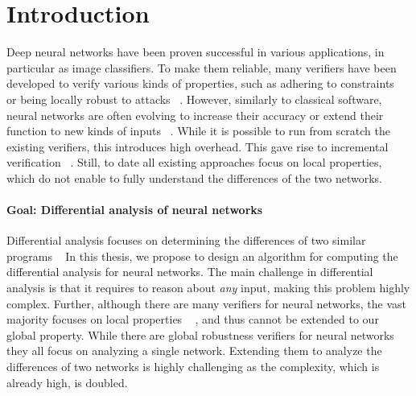 
\section{Introduction}
Deep neural networks have been proven successful in various applications, in particular as image classifiers.
To make them reliable, many verifiers have been developed to verify various kinds of properties, such as adhering to constraints~\cite{Reluplex,COMPLETE,PLANET} or being locally robust to attacks ~\cite{Reluplex,ABSTRACTINTER,NEURIPS2021_fac7fead,COMPLETE}. However, similarly to classical software, neural networks are often evolving to increase their accuracy or extend their function to new kinds of inputs ~\cite{SURVEY_ROBUSTNESS,INTPROP}. While it is possible to run from scratch the existing verifiers, this introduces high overhead. This gave rise to incremental verification ~\cite{IVAN,INC_SEMIDEFINIT,INC_SMOOTH}. Still, to date all existing approaches focus on local properties, which do not enable to fully understand the differences of the two networks.

\paragraph{Goal: Differential analysis of neural networks}
Differential analysis focuses on determining the differences of two similar programs ~\cite{RELUDIFF,NEURODIFF,DIFFRNN,QEBVERIF,CFXROBUSTNESS}
In this thesis, we propose to design an algorithm for computing the differential analysis for neural networks.
The main challenge in differential analysis is that it requires to reason about \emph{any} input, 
making this problem highly complex. Further, although there are many verifiers for neural networks, the vast majority focuses on local properties ~\cite{Reluplex,ABSTRACTINTER,NEURIPS2021_fac7fead,COMPLETE,CROWN}
, and thus cannot be extended to our global property. While there are global robustness verifiers for neural networks ~\cite{Reluplex,ANOTHERGLOBALPROPERTY,MEASURENNROBCON,GLOBALPROPERTY} they all focus on analyzing a single network. Extending them to analyze the differences of two networks is highly challenging as the complexity, which is already high, is doubled.


